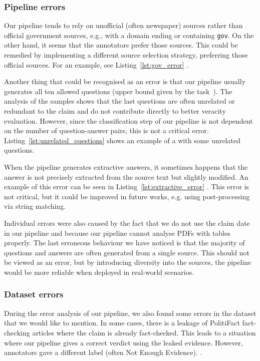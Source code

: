 \subsubsection{Pipeline errors}
Our pipeline tends to rely on unofficial (often newspaper) sources rather than official government sources, e.g., with a domain ending or containing \texttt{gov}. On the other hand, it seems that the annotators prefer those sources. This could be remedied by implementing a different source selection strategy, preferring those official sources. For an example, see Listing~\ref{lst:gov_error} .

Another thing that could be recognised as an error is that our pipeline usually generates all ten allowed questions (upper bound given by the task~\cite{averitec2024}). The analysis of the samples shows that the last questions are often unrelated or redundant to the claim and do not contribute directly to better veracity evaluation. However, since the classification step of our pipeline is not dependent on the number of question-answer pairs, this is not a critical error.
Listing~\ref{lst:unrelated_questions}  shows an example of a  with some unrelated questions.

When the pipeline generates extractive answers, it sometimes happens that the answer is not precisely extracted from the source text but slightly modified. An example of this error can be seen in Listing~\ref{lst:extractive_error} . This error is not critical, but it could be improved in future works, e.g. using post-processing via string matching.

Individual errors were also caused by the fact that we do not use the claim date in our pipeline and because our pipeline cannot analyse PDFs with tables properly. The last erroneous behaviour we have noticed is that the majority of questions and answers are often generated from a single source. This should not be viewed as an error, but by introducing diversity into the sources, the pipeline would be more reliable when deployed in real-world scenarios.

\subsubsection{Dataset errors}
During the error analysis of our pipeline, we also found some errors in the \averitec{} dataset that we would like to mention. In some cases, there is a leakage of PolitiFact  fact-checking articles where the claim is already fact-checked. This leads to a situation where our pipeline gives a correct verdict using the leaked evidence. However, annotators gave a different label (often Not Enough Evidence). . 

